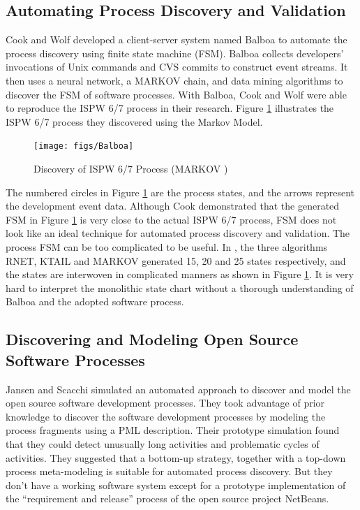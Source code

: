 \documentclass[smallextended]{svjour3}     %
\begin{document}
\subsection{Automating Process Discovery and Validation}
Cook and Wolf \cite{Cook:95,Cook:96} developed a client-server 
system named Balboa to automate the process discovery using 
finite state machine (FSM). Balboa collects developers' 
invocations of Unix commands and CVS commits to construct
event streams. It then uses a neural network, a MARKOV chain, 
and data mining algorithms to discover 
the FSM of software processes. With Balboa, Cook and Wolf 
were able to reproduce the ISPW 6/7 process in their research. 
Figure \ref{fig:Balboa} illustrates the ISPW 6/7 process they 
discovered using the Markov Model.
\begin{figure}[htbp]
  \centering
  \texttt{[image: figs/Balboa]}
  \caption{Discovery of ISPW 6/7 Process (MARKOV )\cite{Cook:95}}
  \label{fig:Balboa}
\end{figure}
The numbered circles in Figure \ref{fig:Balboa} are the process 
states, and the arrows represent the development event data. 
Although Cook demonstrated that the generated FSM in Figure 
\ref{fig:Balboa} is very close to the actual ISPW 6/7 process, 
FSM does not look like an ideal technique for automated process
discovery and validation. The process FSM can be too complicated
to be useful. In \cite{Cook:95}, the three algorithms RNET, KTAIL
and MARKOV generated 15, 20 and 25 states respectively, and the 
states are interwoven in complicated manners as shown in Figure 
\ref{fig:Balboa}. It is very hard to interpret the monolithic 
state chart without a thorough understanding of Balboa and the 
adopted software process.

\subsection{Discovering and Modeling Open Source Software Processes}
Jansen and Scacchi \cite{Jensen:04,Jensen:05} simulated an 
automated approach to discover and model the open source 
software development processes. They took advantage of prior 
knowledge to discover the software development processes by 
modeling the process fragments using a PML description. Their 
prototype simulation found that they could detect unusually 
long activities and problematic cycles of activities. They 
suggested that a bottom-up strategy, together with a top-down 
process meta-modeling is suitable for automated process 
discovery. But they don't have a working software system except 
for a prototype implementation of the ``requirement and 
release'' process of the open source project NetBeans.
\end{document}
